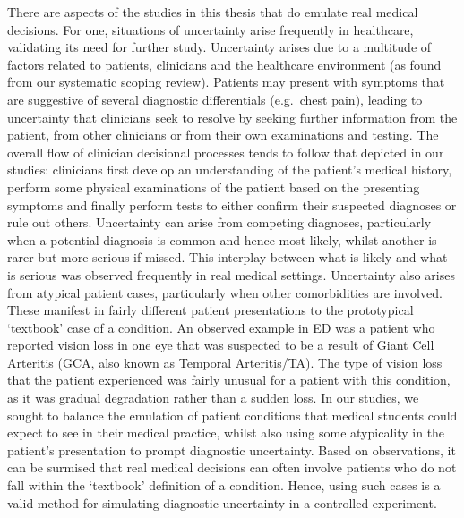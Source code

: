 \documentclass[a4paper, nobind]{templates/ociamthesis}
\begin{document}
\hfill\break
There are aspects of the studies in this thesis that do emulate real medical decisions. For one, situations of uncertainty arise frequently in healthcare, validating its need for further study. Uncertainty arises due to a multitude of factors related to patients, clinicians and the healthcare environment (as found from our systematic scoping review). Patients may present with symptoms that are suggestive of several diagnostic differentials (e.g.~chest pain), leading to uncertainty that clinicians seek to resolve by seeking further information from the patient, from other clinicians or from their own examinations and testing. The overall flow of clinician decisional processes tends to follow that depicted in our studies: clinicians first develop an understanding of the patient's medical history, perform some physical examinations of the patient based on the presenting symptoms and finally perform tests to either confirm their suspected diagnoses or rule out others. Uncertainty can arise from competing diagnoses, particularly when a potential diagnosis is common and hence most likely, whilst another is rarer but more serious if missed. This interplay between what is likely and what is serious was observed frequently in real medical settings. Uncertainty also arises from atypical patient cases, particularly when other comorbidities are involved. These manifest in fairly different patient presentations to the prototypical `textbook' case of a condition. An observed example in ED was a patient who reported vision loss in one eye that was suspected to be a result of Giant Cell Arteritis (GCA, also known as Temporal Arteritis/TA). The type of vision loss that the patient experienced was fairly unusual for a patient with this condition, as it was gradual degradation rather than a sudden loss. In our studies, we sought to balance the emulation of patient conditions that medical students could expect to see in their medical practice, whilst also using some atypicality in the patient's presentation to prompt diagnostic uncertainty. Based on observations, it can be surmised that real medical decisions can often involve patients who do not fall within the `textbook' definition of a condition. Hence, using such cases is a valid method for simulating diagnostic uncertainty in a controlled experiment.
\end{document}
